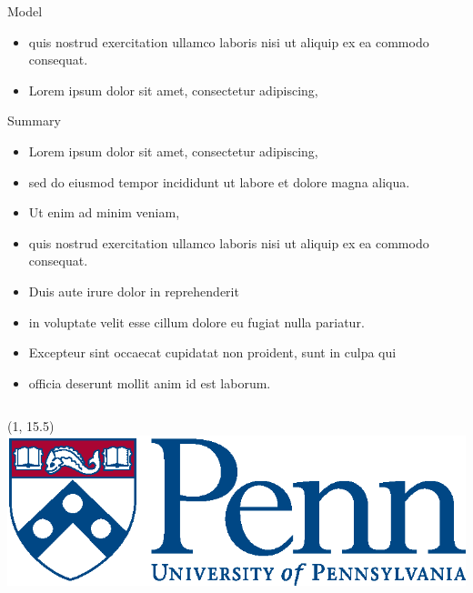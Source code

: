 \documentclass[12pt, final]{beamer}
\newlength{\onecolwid}
\begin{document}
\begin{frame}[t]
\begin{columns}[t]
\begin{column}{\onecolwid}
\begin{block}{Model}
\begin{itemize}
            \item quis nostrud exercitation ullamco laboris nisi ut aliquip ex ea commodo consequat.
            \item Lorem ipsum \alert{dolor} sit amet, consectetur adipiscing,
          \end{itemize}
        \end{block}
        \begin{block}{Summary}
          \begin{itemize}
            \item Lorem ipsum \alert{dolor} sit amet, consectetur adipiscing,
            \item sed do eiusmod tempor incididunt ut labore et dolore magna aliqua.
            \item Ut enim ad minim veniam,
            \item quis nostrud exercitation ullamco laboris nisi ut aliquip ex ea commodo consequat.
            \item Duis aute irure dolor in reprehenderit
            \item in voluptate velit \alert{esse cillum dolore} eu fugiat nulla pariatur.
            \item Excepteur sint occaecat cupidatat non proident, sunt in culpa qui
            \item officia deserunt mollit anim id est laborum.
          \end{itemize}
        \end{block}
      \end{column}

  \end{columns}

  \begin{textblock}{10}(1, 15.5)
   \includegraphics[scale=2]{penn}
  \end{textblock}

\end{frame}
\end{document}
